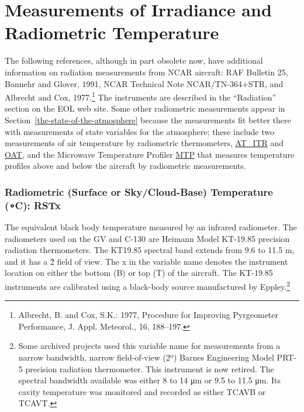 \documentclass[
  english,
]{book}
\begin{document}
\hypertarget{measurements-of-irradiance-and-radiometric-temperature}{%
\section{Measurements of Irradiance and Radiometric Temperature}\label{measurements-of-irradiance-and-radiometric-temperature}}

The following references, although in part obsolete now, have additional information on radiation measurements from NCAR aircraft: RAF Bulletin 25, Bannehr and Glover, 1991, NCAR Technical Note NCAR/TN-364+STR, and Albrecht and Cox, 1977.\footnote{Albrecht, B. and Cox, S.K.: 1977, Procedure for Improving Pyrgeometer Performance, J. Appl. Meteorol., 16, 188--197.}
The instruments are described in the ``Radiation'' section on the EOL web site. Some other radiometric measurements appear in Section~\ref{the-state-of-the-atmosphere} because the measurements fit better there with measurements of state variables for the atmosphere; these include two measurements of air temperature by radiometric thermometers, \protect\hyperlink{AT_ITR}{AT\_ITR} and \protect\hyperlink{OAT}{OAT}, and the Microwave Temperature Profiler \href{http://www.eol.ucar.edu/instruments/microwave-temperature-profiler}{MTP} that measures temperature profiles above and below the aircraft by radiometric measurements.

\hypertarget{rstx}{%
\subsubsection*{\texorpdfstring{Radiometric (Surface or Sky/Cloud-Base) Temperature ({∘C}): RSTx}{Radiometric (Surface or Sky/Cloud-Base) Temperature (∘C): RSTx}}\label{rstx}}

The equivalent black body temperature measured by an infrared radiometer. The radiometers used on the GV and C-130 are Heimann Model KT-19.85 precision radiation thermometers. The KT19.85 spectral band extends from 9.6 to 11.5 m, and it has a 2̊ field of view. The x in the variable name denotes the instrument location on either the bottom (B) or top (T) of the aircraft. The KT-19.85 instruments are calibrated using a black-body source manufactured by Eppley.\footnote{Some archived projects used this variable name for measurements from a narrow bandwidth, narrow field-of-view (2{º}) Barnes Engineering Model PRT-5 precision radiation thermometer. This instrument is now retired. The spectral bandwidth available was either 8 to 14 {μm} or 9.5 to 11.5 {μm}. Its cavity temperature was monitored and recorded as either TCAVB or TCAVT.}
\end{document}
